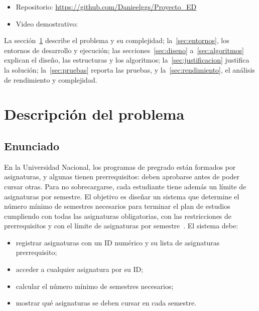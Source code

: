 \documentclass[11pt,letterpaper]{article}
\newcommand{\pendiente}[1]{\leavevmode{\color{rojo}\textbf{[PENDIENTE:} #1\textbf{]}}}
\begin{document}
\begin{itemize}
\item Repositorio: \url{https://github.com/Danieelggs/Proyecto_ED}
\item Video demostrativo: \pendiente{enlace al video}
\end{itemize}

La sección~\ref{sec:problema} describe el problema y su complejidad; la~\ref{sec:entornos}, los entornos de desarrollo y ejecución; las secciones~\ref{sec:diseno} a~\ref{sec:algoritmos} explican el diseño, las estructuras y los algoritmos; la~\ref{sec:justificacion} justifica la solución; la~\ref{sec:pruebas} reporta las pruebas, y la~\ref{sec:rendimiento}, el análisis de rendimiento y complejidad.

\section{Descripción del problema}\label{sec:problema}

\subsection{Enunciado}
En la Universidad Nacional, los programas de pregrado están formados por asignaturas, y algunas tienen prerrequisitos: deben aprobarse antes de poder cursar otras. Para no sobrecargarse, cada estudiante tiene además un límite de asignaturas por semestre. El objetivo es diseñar un sistema que determine el número mínimo de semestres necesarios para terminar el plan de estudios cumpliendo con todas las asignaturas obligatorias, con las restricciones de prerrequisitos y con el límite de asignaturas por semestre~\cite{herrera2026}. El sistema debe:
\begin{itemize}
\item registrar asignaturas con un ID numérico y su lista de asignaturas prerrequisito;
\item acceder a cualquier asignatura por su ID;
\item calcular el número mínimo de semestres necesarios;
\item mostrar qué asignaturas se deben cursar en cada semestre.
\end{itemize}
\end{document}
